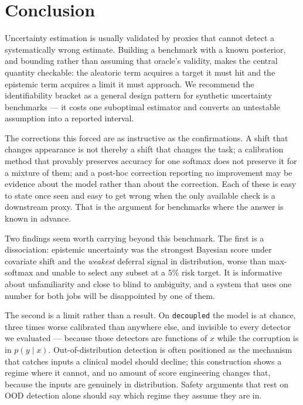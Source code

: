 \documentclass{article}
\begin{document}
\section{Conclusion}

Uncertainty estimation is usually validated by proxies that cannot detect a
systematically wrong estimate. Building a benchmark with a known posterior, and
bounding rather than assuming that oracle's validity, makes the central quantity
checkable: the aleatoric term acquires a target it must hit and the epistemic
term acquires a limit it must approach. We recommend the identifiability bracket
as a general design pattern for synthetic uncertainty benchmarks --- it costs one
suboptimal estimator and converts an untestable assumption into a reported
interval.

The corrections this forced are as instructive as the confirmations. A shift that
changes appearance is not thereby a shift that changes the task; a calibration
method that provably preserves accuracy for one softmax does not preserve it for a
mixture of them; and a post-hoc correction reporting no improvement may be
evidence about the model rather than about the correction. Each of these is easy
to state once seen and easy to get wrong when the only available check is a
downstream proxy. That is the argument for benchmarks where the answer is known
in advance.

Two findings seem worth carrying beyond this benchmark. The first is a
dissociation: epistemic uncertainty was the strongest Bayesian score under
covariate shift and the \emph{weakest} deferral signal in distribution, worse
than max-softmax and unable to select any subset at a $5\%$ risk target. It is
informative about unfamiliarity and close to blind to ambiguity, and a system
that uses one number for both jobs will be disappointed by one of them.

The second is a limit rather than a result. On \texttt{decoupled} the model is at
chance, three times worse calibrated than anywhere else, and invisible to every
detector we evaluated --- because those detectors are functions of $x$ while the
corruption is in $p(y \mid x)$. Out-of-distribution detection is often positioned
as the mechanism that catches inputs a clinical model should decline; this
construction shows a regime where it cannot, and no amount of score engineering
changes that, because the inputs are genuinely in distribution. Safety arguments
that rest on OOD detection alone should say which regime they assume they are in.
\end{document}
